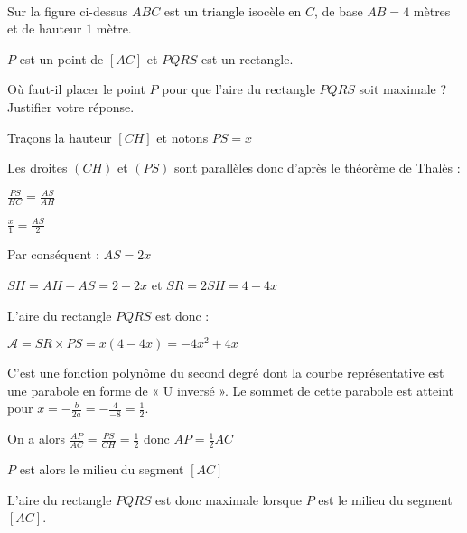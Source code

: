 
%
\\ 
 \begin{center}
      \end{center}
Sur la figure ci-dessus $ABC$ est un triangle isocèle en $C$, de base $AB= 4$ mètres et de hauteur $1$ mètre.
\par
$P$ est un point de $\left[AC\right]$ et $PQRS$ est un rectangle.
\par
Où faut-il placer le point $P$ pour que l'aire du rectangle $PQRS$ soit maximale ? Justifier votre réponse.
\begin{corrige}
     Traçons la hauteur $\left[CH\right]$ et notons $PS=x$

\begin{center}
\end{center}
     Les droites $\left(CH\right)$ et $\left(PS\right)$ sont parallèles donc d'après le théorème de Thalès :
     \par
     $\frac{PS}{HC}=\frac{AS}{AH}$
     \par
     $\frac{x}{1}=\frac{AS}{2}$
     \par
     Par conséquent : $AS=2x$
     \par
     $SH=AH-AS=2-2x$ et $SR=2SH=4-4x$
     \par
     L'aire du rectangle $PQRS$ est donc :
     \par
     $\mathscr A=SR\times PS=x\left(4-4x\right)=-4x^{2}+4x$
     \par
     C'est une fonction polynôme du second degré dont la courbe représentative est une parabole en forme de « U inversé ». Le sommet de cette parabole est atteint pour $x=-\frac{b}{2a}=-\frac{4}{-8}=\frac{1}{2}$.
     \par
     On a alors $\frac{AP}{AC}=\frac{PS}{CH}=\frac{1}{2}$ donc $AP=\frac{1}{2}AC$
     \par
     $P$ est alors le milieu du segment $\left[AC\right]$
     \par
     L'aire du rectangle $PQRS$ est donc maximale lorsque $P$ est le milieu du segment $\left[AC\right]$.
\end{corrige}

